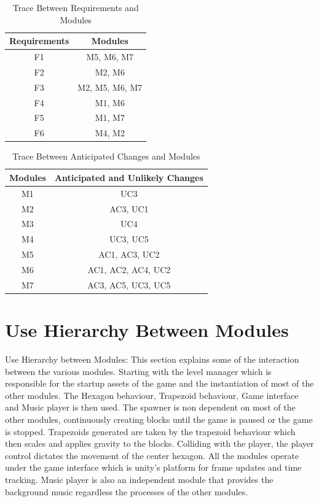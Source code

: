 \documentclass[12pt, titlepage]{article}
\begin{document}
\begin{center}
\begin{table}[h!]
\centering
\begin{tabular}{ |c| c| }\hline

 \textbf{Requirements}         & \textbf{Modules}  \\ \hline
 F1   & M5, M6, M7  \\ \hline
 F2   & M2, M6  \\ \hline
 F3   & M2, M5, M6, M7  \\ \hline
 F4   & M1, M6  \\ \hline
 F5   & M1, M7  \\ \hline
 F6   & M4, M2  \\ \hline
 
\end{tabular}
\caption{Trace Between Requirements and Modules}
\end{table}
\end{center}

\begin{center}
\begin{table}[h!]
\centering
\begin{tabular}{ |c| c| }\hline

 \textbf{Modules}    & \textbf{Anticipated and Unlikely Changes}  \\ \hline
 M1   & UC3  \\ \hline
 M2   & AC3, UC1  \\ \hline
 M3   & UC4  \\ \hline
 M4   & UC3, UC5  \\ \hline
 M5   & AC1, AC3, UC2  \\ \hline
 M6   & AC1, AC2, AC4, UC2  \\ \hline
 M7   & AC3, AC5, UC3, UC5  \\ \hline
 
\end{tabular}
\caption{Trace Between Anticipated Changes and Modules}
\end{table}
\end{center}



\section{Use Hierarchy Between Modules}
Use Hierarchy between Modules: This section explains some of the interaction between the various modules. Starting with the level manager which is responsible for the startup assets of the game and the instantiation of most of the other modules. The Hexagon behaviour, Trapezoid behaviour, Game interface and Music player is then used. The spawner is non dependent on most of the other modules, continuously creating blocks until the game is paused or the game is stopped. Trapezoids generated are taken by the trapezoid behaviour which then scales and applies gravity to the blocks. Colliding with the player, the player control dictates the movement of the center hexagon. All the modules operate under the game interface which is unity’s platform for frame updates and time tracking. Music player is also an independent module that provides the background music regardless the processes of the other modules.
\end{document}
